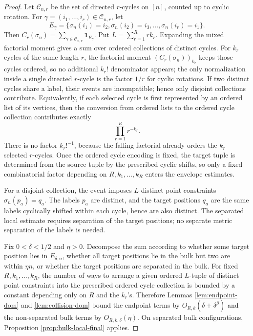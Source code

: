 \documentclass[11pt]{article}
\theoremstyle{remark}
\newcommand{\one}{\mathbf 1}
\newcommand{\calC}{\mathcal C}
\begin{document}
\begin{proof}
Let \(\calC_{n,r}\) be the set of directed \(r\)-cycles on \([n]\), counted up to cyclic rotation.  For \(\gamma=(i_1,\ldots,i_r)\in\calC_{n,r}\), let
\[
        E_\gamma=\{\sigma_n(i_1)=i_2,
        \sigma_n(i_2)=i_3,
        \ldots,
        \sigma_n(i_r)=i_1\}.
\]
Then \(C_r(\sigma_n)=\sum_{\gamma\in\calC_{n,r}}\one_{E_\gamma}\).  Put \(L=\sum_{r=1}^R r k_r\).  Expanding the mixed factorial moment gives a sum over ordered collections of distinct cycles.  For \(k_r\) cycles of the same length \(r\), the factorial moment \((C_r(\sigma_n))_{k_r}\) keeps those cycles ordered, so no additional \(k_r!\) denominator appears; the only normalization inside a single directed \(r\)-cycle is the factor \(1/r\) for cyclic rotations.  If two distinct cycles share a label, their events are incompatible; hence only disjoint collections contribute.
Equivalently, if each selected cycle is first represented by an ordered list
of its vertices, then the conversion from ordered lists to the ordered cycle
collection contributes exactly
\[
        \prod_{r=1}^R r^{-k_r}.
\]
There is no factor \(k_r!^{-1}\), because the falling factorial already orders
the \(k_r\) selected \(r\)-cycles.  Once the ordered cycle encoding is fixed,
the target tuple is determined from the source tuple by the prescribed cyclic
shifts, so only a fixed combinatorial factor depending on
\(R,k_1,\ldots,k_R\) enters the envelope estimates.


For a disjoint collection, the event imposes \(L\) distinct point constraints \(\sigma_n(p_a)=q_a\).  The labels \(p_a\) are distinct, and the target positions \(q_a\) are the same labels cyclically shifted within each cycle, hence are also distinct.  The separated local estimate requires separation of the target positions; no separate metric separation of the labels is needed.

Fix \(0<\delta<1/2\) and \(\eta>0\).  Decompose the sum according to whether some target position lies in \(E_{\delta,n}\), whether all target positions lie in the bulk but two are within \(\eta n\), or whether the target positions are separated in the bulk.  For fixed \(R,k_1,\ldots,k_R\), the number of ways to arrange a given ordered \(L\)-tuple of distinct point constraints into the prescribed ordered cycle collection is bounded by a constant depending only on \(R\) and the \(k_r\)'s.  Therefore Lemmas \ref{lem:endpoint-dom} and \ref{lem:collision-dom} bound the endpoint terms by \(O_{R,k}(\delta+\delta^\beta)\) and the non-separated bulk terms by \(O_{R,k,\delta}(\eta)\).  On separated bulk configurations, Proposition \ref{prop:bulk-local-final} applies.


\end{proof}
\end{document}
